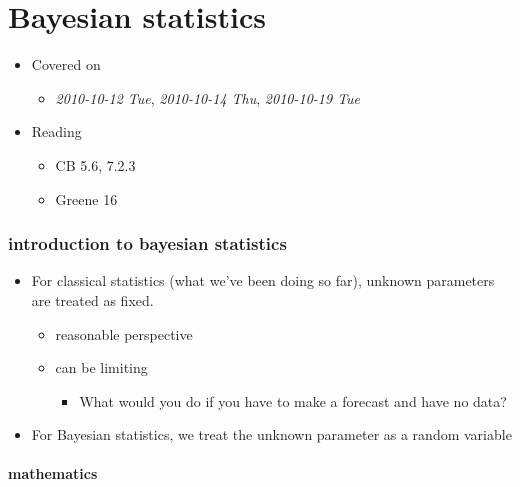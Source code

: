 
\part*{Bayesian statistics}%

\begin{itemize}
\item Covered on
\begin{itemize}
\item \textit{2010-10-12 Tue}, \textit{2010-10-14 Thu}, \textit{2010-10-19 Tue}
\end{itemize}
\item Reading
\begin{itemize}
\item CB 5.6, 7.2.3
\item Greene 16
\end{itemize}
\end{itemize}
\section{introduction to bayesian statistics}
\label{sec-1}

\begin{itemize}
\item For classical statistics (what we've been doing so far), unknown parameters are treated as fixed.
\begin{itemize}
\item reasonable perspective
\item can be limiting
\begin{itemize}
\item What would you do if you have to make a forecast and have no data?
\end{itemize}
\end{itemize}
\item For Bayesian statistics, we treat the unknown parameter as a
      random variable
\end{itemize}
\subsection{mathematics}
\label{sec-1-1}

